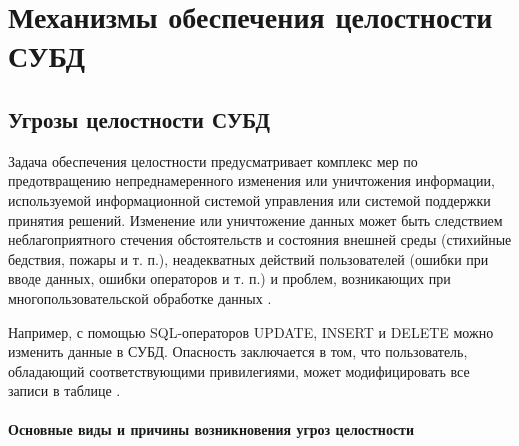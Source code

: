 \section{Механизмы обеспечения целостности СУБД}

\subsection{Угрозы целостности СУБД}
Задача обеспечения целостности предусматривает комплекс мер по предотвращению непреднамеренного изменения или уничтожения информации, используемой информационной системой управления или системой поддержки принятия решений. Изменение или уничтожение данных может быть следствием неблагоприятного стечения обстоятельств и состояния внешней среды (стихийные бедствия, пожары и т. п.), неадекватных действий пользователей (ошибки при вводе данных, ошибки операторов и т. п.) и проблем, возникающих при многопользовательской обработке данных \autocite{Lihonosov2011}.

Например, с помощью SQL-операторов UPDATE, INSERT и DELETE можно изменить данные в СУБД. Опасность заключается в том, что пользователь, обладающий соответствующими привилегиями, может модифицировать все записи в таблице \autocite{Utebov2008}.

\paragraph{Основные виды и причины возникновения угроз целостности} ~\\

